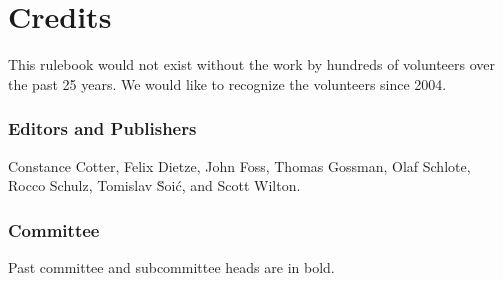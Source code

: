 \part{Credits}

This rulebook would not exist without the work by hundreds of volunteers over the past 25 years.
We would like to recognize the volunteers since 2004.

\section{Editors and Publishers}
Constance Cotter,
Felix Dietze,
John Foss,
Thomas Gossman,
Olaf Schlote,
Rocco Schulz,
Tomislav \u{S}oi\'{c},
and Scott Wilton.

\section{Committee}

Past committee and subcommittee heads are in bold.

